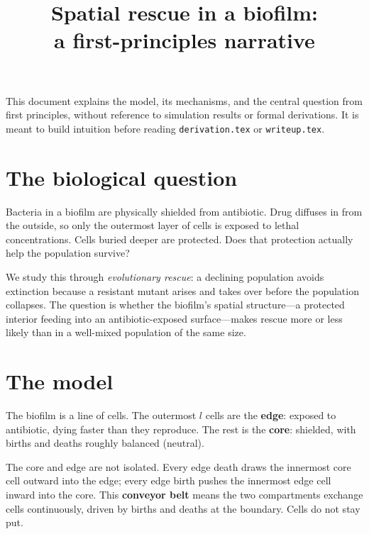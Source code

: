 \documentclass[12pt]{article}
\title{Spatial rescue in a biofilm:\\a first-principles narrative}
\author{}
\date{}
\begin{document}
\maketitle

\noindent This document explains the model, its mechanisms, and the central
question from first principles, without reference to simulation results or
formal derivations. It is meant to build intuition before reading
\texttt{derivation.tex} or \texttt{writeup.tex}.

\section{The biological question}

Bacteria in a biofilm are physically shielded from antibiotic. Drug diffuses
in from the outside, so only the outermost layer of cells is exposed to
lethal concentrations. Cells buried deeper are protected. Does that
protection actually help the population survive?

We study this through \emph{evolutionary rescue}: a declining population
avoids extinction because a resistant mutant arises and takes over before
the population collapses. The question is whether the biofilm's spatial
structure---a protected interior feeding into an antibiotic-exposed
surface---makes rescue more or less likely than in a well-mixed population
of the same size.

\section{The model}

The biofilm is a line of cells. The outermost $l$ cells are the
\textbf{edge}: exposed to antibiotic, dying faster than they reproduce. The
rest is the \textbf{core}: shielded, with births and deaths roughly balanced
(neutral).

The core and edge are not isolated. Every edge death draws the innermost
core cell outward into the edge; every edge birth pushes the innermost edge
cell inward into the core. This \textbf{conveyor belt} means the two
compartments exchange cells continuously, driven by births and deaths at the
boundary. Cells do not stay put.
\end{document}
